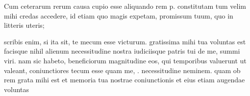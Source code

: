 


 Cum ceterarum rerum causa cupio esse aliquando rem p. constitutam tum velim mihi credas accedere, id etiam quo magis expetam, promissum tuum, quo in litteris uteris;

 scribis enim, si ita sit, te mecum esse victurum. gratissima mihi tua voluntas est facisque nihil alienum necessitudine nostra iudiciisque patris tui de me, summi viri. nam sic habeto, beneficiorum magnitudine eos, qui temporibus valuerunt ut valeant, coniunctiores tecum esse quam me, . necessitudine neminem. quam ob rem grata mihi est et memoria tua nostrae coniunctionis et eius etiam augendae voluntas
